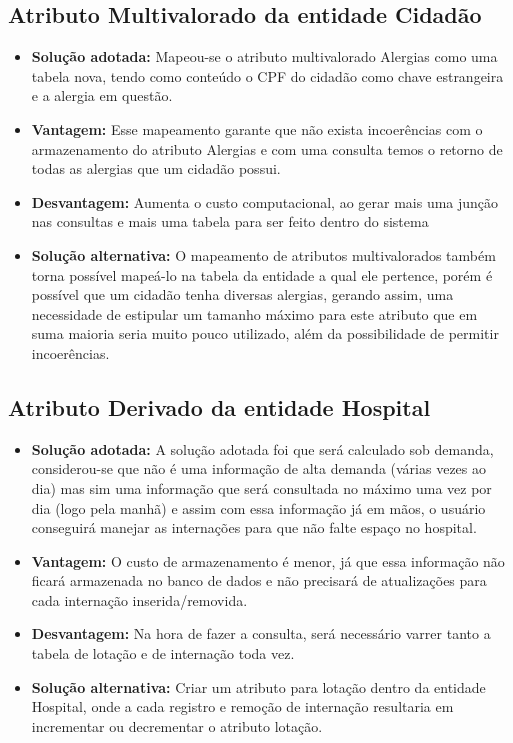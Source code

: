 \documentclass[12pt, a4paper]{article}
\begin{document}
\subsection{Atributo Multivalorado da entidade Cidadão}
\begin{itemize}
    \item \textbf{Solução adotada:} Mapeou-se o atributo multivalorado Alergias como uma tabela nova,
        tendo como conteúdo o CPF do cidadão como chave estrangeira e a alergia em questão.

    \item \textbf{Vantagem:} Esse mapeamento garante que não exista incoerências com o
        armazenamento do atributo Alergias e com uma consulta temos o retorno de todas as
        alergias que um cidadão possui.

    \item \textbf{Desvantagem:} Aumenta o custo computacional, ao gerar mais uma junção 
    nas consultas e mais uma tabela para ser feito dentro do sistema

    \item \textbf{Solução alternativa:} O mapeamento de atributos multivalorados também torna possível 
    mapeá-lo na tabela da entidade a qual ele pertence, porém é possível que um cidadão tenha diversas alergias, 
    gerando assim, uma necessidade de estipular um tamanho máximo para este atributo que em suma maioria seria 
    muito pouco utilizado, além da possibilidade de permitir incoerências.
\end{itemize}

\subsection{Atributo Derivado da entidade Hospital}
\begin{itemize}
    \item \textbf{Solução adotada:} A solução adotada foi que será calculado sob demanda, considerou-se
que não é uma informação de alta demanda (várias vezes ao dia) mas sim uma
informação que será consultada no máximo uma vez por dia (logo pela manhã) e assim
com essa informação já em mãos, o usuário conseguirá manejar as internações para que
não falte espaço no hospital.

    \item \textbf{Vantagem:} O custo de armazenamento é menor, já que essa informação não ficará
armazenada no banco de dados e não precisará de atualizações para cada internação
inserida/removida.

    \item \textbf{Desvantagem:} Na hora de fazer a consulta, será necessário varrer tanto a tabela de
lotação e de internação toda vez.

    \item \textbf{Solução alternativa:} Criar um atributo para lotação dentro da entidade Hospital, onde a
cada registro e remoção de internação resultaria em incrementar ou decrementar o
atributo lotação.

\end{itemize}
\end{document}
